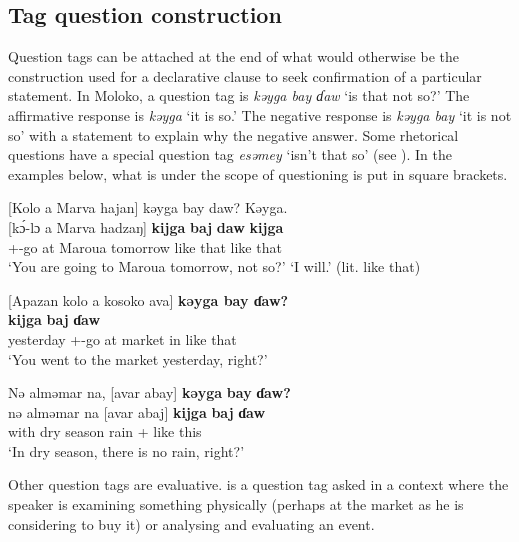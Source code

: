 \subsection{Tag question construction}\label{sec:10.3.3}
\hypertarget{RefHeading1213041525720847}{}
Question tags can be attached at the end of what would otherwise be the construction used for a declarative clause to seek confirmation of a particular statement. In Moloko, a question tag is \textit{kəyga bay ɗaw} ‘is that not so?’ The affirmative response is \textit{kəyga} ‘it is so.' The negative response is \textit{kəyga bay }‘it is not so’ with a statement to explain why the negative answer. Some rhetorical questions have a special question tag \textit{esəmey} ‘isn’t that so’ (see ). In the examples below, what is under the scope of questioning is put in square brackets. 

\ea \label{ex:10:91}
[Kolo  a  Marva  hajan]  kəyga  bay  daw?   \hspace{65pt}       Kəyga.\\
\gll  {}[k\'{ɔ}-lɔ   a   Marva  hadzaŋ]   \textbf{kijga}    \textbf{baj}   \textbf{daw} \hspace{5pt}   \textbf{kijga}\\
      {\twoS}+{\IFV}-go  at  Maroua  tomorrow  {like that}    {\NEG}  {\QUEST}  {}  {like that}\\
\glt  ‘You are going to Maroua tomorrow, not so?’  \hspace{35pt}          ‘I will.’ (lit. like that)
\z 

\ea \label{ex:10:92}
{}[Apazan  kolo  a  kosoko  ava]  \textbf{kəyga  bay  ɗaw?}\\
  \textbf{kijga}  \textbf{baj}  \textbf{ɗaw}\\
      yesterday  {\twoS}+{\PFV}-go  at  market  in  {like that}  {\NEG}  {\QUEST}\\
\glt  ‘You went to the market yesterday, right?’
\z 

\ea \label{ex:10:93}
Nə  alməmar  na,  [avar  abay]  \textbf{kəyga}  \textbf{bay}  \textbf{ɗaw?}\\
\gll  nə    alməmar   na  [avar   abaj]     \textbf{kijga}   \textbf{baj}   \textbf{ɗaw}\\
      with      {dry season}  {\PSP}  rain  {\EXT}+{\NEG}  {like this}  {\NEG}  {\QUEST}\\ 
\glt  ‘In dry season, there is no rain, right?’  
\z 

Other question tags are evaluative.  is a question tag asked in a context where the speaker is examining something physically (perhaps at the market as he is considering to buy it) or analysing and evaluating an event. 

